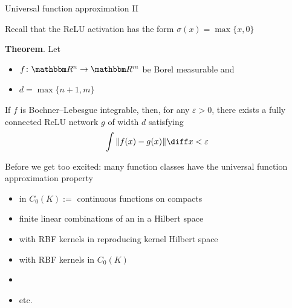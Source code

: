 \begin{frame}{Universal function approximation II}

    Recall that the ReLU activation has the form $\sigma(x) = \max\{x, 0 \}$

    \medskip
    \medskip

    \textbf{Theorem}. Let 
    \begin{itemize}
        \item $f \colon \RR^n \to \RR^m$ be Borel measurable and
        \item $d = \max\{n+1,m\}$
    \end{itemize}

    \medskip
    If $f$ is Bochner–Lebesgue integrable, then, for any $\varepsilon > 0$,
    there exists a fully connected ReLU network $g$ of width $d$ 
    satisfying 
    \begin{equation*}
        \int \|f(x) - g(x)\| \diff x < \varepsilon
    \end{equation*}

\end{frame}


\begin{frame}
    
    Before we get too excited: many function classes have the universal function
    approximation property

            \vspace{0.4em}
    \begin{itemize}
        \item {} in $C_0(K) :=$ continuous functions on compacts 
            \vspace{0.4em}
        \item finite linear combinations of an  in a Hilbert space
            \vspace{0.4em}
        \item {} with RBF kernels in reproducing kernel Hilbert space
            \vspace{0.4em}
        \item {} with RBF kernels in $C_0(K)$
            \vspace{0.4em}
        \item {}
            \vspace{0.4em}
        \item etc.
    \end{itemize}

\end{frame}



